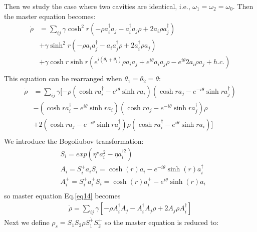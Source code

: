 \documentclass{article}
\begin{document}
Then we study the case where two cavities are identical, i.e., $\omega_1=\omega_2=\omega_0$. Then the master equation becomes:
\begin{equation}
\label{eq13}
\begin{split}
\dot{\rho}&=\sum_{ij}\gamma\cosh^{2}r(-\rho a_{i}^{\dagger}a_{j}-a_{i}^{\dagger}a_{j}\rho+2a_{i}\rho a_{j}^{\dagger})\\
&+\gamma\sinh^{2}r(-\rho a_{i}a_{j}^{\dagger}-a_{i}a_{j}^{\dagger}\rho+2a_{i}^{\dagger}\rho a_{j})\\
&+\gamma\cosh r\sinh r(e^{i(\theta_{i}+\theta_{j})}\rho a_{i}a_{j}+e^{i\theta}a_{i}a_{j}\rho-e^{i\theta}2a_{i}\rho a_{j}+h.c.)\\
\end{split}
\end{equation}
This equation can be rearranged when $\theta_1=\theta_2=\theta$:
\begin{equation}
\label{eq14}
\begin{split}
\dot{\rho}&=\sum_{ij}\gamma[-\rho(\cosh ra_{i}^{\dagger}-e^{i\theta}\sinh ra_{i})(\cosh ra_{j}-e^{-i\theta}\sinh ra_{j}^{\dagger})\\
&-(\cosh ra_{i}^{\dagger}-e^{i\theta}\sinh ra_{i})(\cosh ra_{j}-e^{-i\theta}\sinh ra_{j}^{\dagger})\rho\\
&+2(\cosh ra_{j}-e^{-i\theta}\sinh ra_{j}^{\dagger})\rho(\cosh ra_{i}^{\dagger}-e^{i\theta}\sinh ra_{i})]\\
\end{split}
\end{equation}
We introduce the Bogoliubov transformation:
\begin{equation}
\label{eq15}
\begin{split}
&S_{i}=exp(\eta^{\star}a_{i}^{2}-\eta a_{i}^{\dagger2})\\
&A_{i}=S_{i}^{+}a_{i}S_{i}=\cosh(r)a_{i}-e^{-i\theta}\sinh(r)a_{i}^{\dagger} \\
&A_{i}^{+}=S_{i}^{+}a_{i}^{+}S_{i}=\cosh(r)a_{i}^{+}-e^{i\theta}\sinh(r)a_{i}\\
\end{split}
\end{equation}
so master equation Eq.\eqref{eq14} becomes
\begin{equation}
\label{eq16}
\begin{split}
\dot{\rho}=\sum_{ij}\gamma[-\rho A_{i}^{\dagger}A_{j}-A_{i}^{\dagger}A_{j}\rho+2A_{j}\rho A_{i}^{\dagger}]
\end{split}
\end{equation}
Next we define $ \rho_{s}=S_{1}S_{2}\dot{\rho S_{1}^{+}S_{2}^{+}}$ so the master equation is reduced to:
\end{document}
